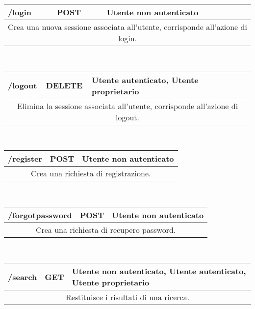 		\begin{table}[h]
			\begin{tabular}{|p{}|p{}|p{}|}
				\toprule
				\textbf{/login}	& \textbf{POST} & \textbf{Utente non autenticato} \\ \midrule
				\multicolumn{3}{|c|}{Crea una nuova sessione associata all'utente, corrisponde all'azione di login.} \\
				\bottomrule
			\end{tabular}\\
			\par\bigskip
			
			\begin{tabular}{|p{}|p{}|p{}|}
				\toprule
				\textbf{/logout} & \textbf{DELETE} & \textbf{Utente autenticato, Utente proprietario} \\ \midrule
				\multicolumn{3}{|c|}{Elimina la sessione associata all'utente, corrisponde all'azione di logout.} \\
				\bottomrule
			\end{tabular}\\
			\par\bigskip
			
			\begin{tabular}{|p{}|p{}|p{}|}
				\toprule
				\textbf{/register} & \textbf{POST} & \textbf{Utente non autenticato} \\ \midrule
				\multicolumn{3}{|c|}{Crea una richiesta di registrazione.} \\
				\bottomrule
			\end{tabular}\\
			\par\bigskip
			
			\begin{tabular}{|p{}|p{}|p{}|}
				\toprule
				\textbf{/forgotpassword} & \textbf{POST} & \textbf{Utente non autenticato} \\ \midrule
				\multicolumn{3}{|c|}{Crea una richiesta di recupero password.} \\
				\bottomrule
			\end{tabular}\\
			\par\bigskip
			
			\begin{tabular}{|p{}|p{}|p{}|}
				\toprule
				\textbf{/search} & \textbf{GET} & \textbf{Utente non autenticato, Utente autenticato, Utente proprietario} \\ \midrule
				\multicolumn{3}{|c|}{Restituisce i risultati di una ricerca.} \\
				\bottomrule
			\end{tabular}\\
			\par\bigskip
			

\end{table}
